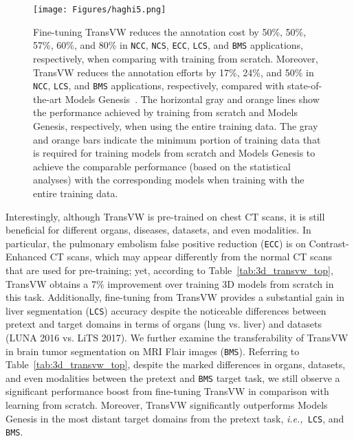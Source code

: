 \documentclass[journal,twoside,web]{ieeecolor}
\def\tablename{Table}
\newcommand{\ie}{\mbox{\emph{i.e.,\ }}}
\begin{document}
\begin{figure*}[t]
\centerline{\texttt{[image: Figures/haghi5.png]}}
\caption{
Fine-tuning  TransVW reduces the annotation cost by 50\%, 50\%, 57\%, 60\%, and 80\%  in \texttt{NCC}, \texttt{NCS}, \texttt{ECC}, \texttt{LCS}, and \texttt{BMS} applications, respectively, when comparing with training from scratch. Moreover,  TransVW reduces the annotation efforts by 17\%, 24\%, and 50\% in \texttt{NCC}, \texttt{LCS}, and \texttt{BMS} applications, respectively, compared with state-of-the-art Models Genesis~\cite{zhou2019models}.
The horizontal gray and orange lines show the performance achieved by training from scratch and Models Genesis, respectively, when using the entire  training data. The gray and orange bars indicate the minimum portion of training data that is required for training models from scratch and Models Genesis to achieve the comparable performance (based on the statistical analyses) with the corresponding models when training with the entire  training data.  
}
\label{fig:annotation_saving}
\end{figure*} 
 Interestingly, although TransVW is pre-trained on chest CT scans, it is still beneficial for  different organs, diseases, datasets, and even modalities. In particular,  the pulmonary embolism false positive reduction (\texttt{ECC}) is on Contrast-Enhanced CT scans, which may appear differently from the normal CT scans that are used for pre-training; yet, according to \tablename~\ref{tab:3d_transvw_top}, TransVW obtains a 7\% improvement over training 3D models from scratch in this task. Additionally, fine-tuning from TransVW provides a substantial gain in liver segmentation (\texttt{LCS}) accuracy despite the noticeable differences between pretext and target domains in terms of organs (lung vs. liver) and datasets (LUNA 2016 vs. LiTS 2017). We further examine the transferability of TransVW in brain tumor segmentation on MRI Flair images (\texttt{BMS}). Referring to   \tablename~\ref{tab:3d_transvw_top}, despite the marked differences in organs, datasets, and even modalities between the pretext and \texttt{BMS} target task, we still observe a significant performance boost from fine-tuning TransVW  in comparison with learning   from scratch.
Moreover, TransVW significantly outperforms Models Genesis in the most distant target domains  from the pretext task, \ie  \texttt{LCS}, and \texttt{BMS}. 
\end{document}
